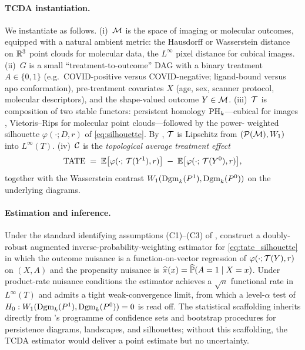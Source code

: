 \paragraph{TCDA instantiation.}
We instantiate  as follows. (i)~$\mathcal{M}$ is the space of
imaging or molecular outcomes, equipped with a natural ambient metric:
the Hausdorff or Wasserstein distance on $\mathbb{R}^3$ point clouds for
molecular data, the $L^\infty$ pixel distance for cubical images.
(ii)~$G$ is a small ``treatment-to-outcome'' DAG with a binary
treatment $A \in \{0,1\}$ (e.g.\ COVID-positive versus
COVID-negative; ligand-bound versus apo conformation), pre-treatment
covariates $X$ (age, sex, scanner protocol, molecular descriptors),
and the shape-valued outcome $Y \in \mathcal{M}$. (iii)~$\mathcal{T}$ is composition of
two stable functors: persistent homology
$\mathrm{PH}_{k}$---cubical for images \citep{kaczynski2004computational},
Vietoris--Rips for molecular point clouds---followed by the power-
weighted silhouette $\varphi(\cdot; D, r)$ of \cref{eq:silhouette}.
By , $\mathcal{T}$ is Lipschitz from
$(\mathcal{P}(\mathcal{M}), W_1)$ into $L^\infty(T)$. (iv)~$\mathcal{C}$ is the
\emph{topological average treatment effect}
\begin{equation}
  \operatorname{TATE} \;=\; \mathbb{E}\bigl[\varphi(\cdot;\,\mathcal{T}(Y^1),r)\bigr]
              \;-\; \mathbb{E}\bigl[\varphi(\cdot;\,\mathcal{T}(Y^0),r)\bigr],
  \label{eq:tate_silhouette}
\end{equation}
together with the Wasserstein contrast
$W_1(\mathrm{Dgm}_{k}(P^1),\mathrm{Dgm}_{k}(P^0))$ on the underlying diagrams.

\paragraph{Estimation and inference.}
Under the standard identifying assumptions (C1)--(C3) of
, \citet{kim2026topological} construct a doubly-
robust augmented inverse-probability-weighting estimator for
\cref{eq:tate_silhouette} in which the outcome nuisance is a
function-on-vector regression of $\varphi(\cdot; \mathcal{T}(Y), r)$ on
$(X,A)$ and the propensity nuisance is $\widehat\pi(x) = \widehat{\mathbb{P}}(A=1\mid X = x)$.
Under product-rate nuisance conditions the estimator achieves a
$\sqrt n$ functional rate in $L^\infty(T)$ and admits a tight
weak-convergence limit, from which a level-$\alpha$ test of
$H_0 : W_1(\mathrm{Dgm}_{k}(P^1),\mathrm{Dgm}_{k}(P^0)) = 0$ is read off. The
statistical scaffolding inherits directly from
\citet{lecci2014statistical}'s programme of confidence sets and
bootstrap procedures for persistence diagrams, landscapes, and
silhouettes; without this scaffolding, the TCDA estimator would deliver
a point estimate but no uncertainty.

